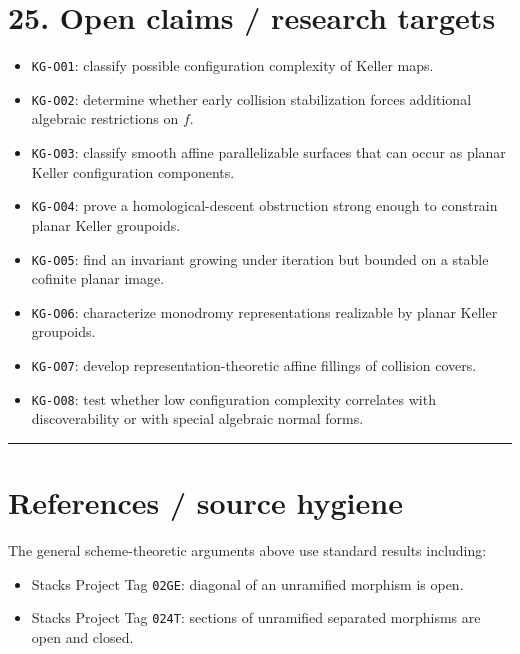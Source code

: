 \section{25. Open claims / research
targets}\label{open-claims-research-targets}

\begin{itemize}
\tightlist
\item
  \texttt{KG-O01}: classify possible configuration complexity of Keller
  maps.
\item
  \texttt{KG-O02}: determine whether early collision stabilization
  forces additional algebraic restrictions on \(f\).
\item
  \texttt{KG-O03}: classify smooth affine parallelizable surfaces that
  can occur as planar Keller configuration components.
\item
  \texttt{KG-O04}: prove a homological-descent obstruction strong enough
  to constrain planar Keller groupoids.
\item
  \texttt{KG-O05}: find an invariant growing under iteration but bounded
  on a stable cofinite planar image.
\item
  \texttt{KG-O06}: characterize monodromy representations realizable by
  planar Keller groupoids.
\item
  \texttt{KG-O07}: develop representation-theoretic affine fillings of
  collision covers.
\item
  \texttt{KG-O08}: test whether low configuration complexity correlates
  with discoverability or with special algebraic normal forms.
\end{itemize}

\begin{center}\rule{0.5\linewidth}{0.5pt}\end{center}

\section{References / source hygiene}\label{references-source-hygiene}

The general scheme-theoretic arguments above use standard results
including:

\begin{itemize}
\tightlist
\item
  Stacks Project Tag \texttt{02GE}: diagonal of an unramified morphism
  is open.
\item
  Stacks Project Tag \texttt{024T}: sections of unramified separated
  morphisms are open and closed.
\end{itemize}


